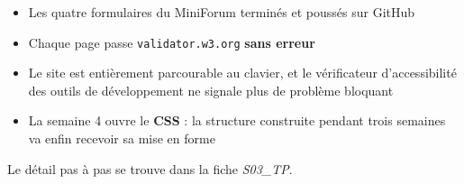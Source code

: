 \documentclass[a4paper,11pt]{article}
\begin{document}
\vspace{8pt}
\begin{tcolorbox}[attention, title={Pour la semaine 4}]
\begin{itemize}
  \item Les quatre formulaires du MiniForum terminés et poussés sur GitHub
  \item Chaque page passe \texttt{validator.w3.org} \textbf{sans erreur}
  \item Le site est entièrement parcourable au clavier, et le vérificateur d'accessibilité des outils de développement ne signale plus de problème bloquant
  \item La semaine 4 ouvre le \textbf{CSS} : la structure construite pendant trois semaines va enfin recevoir sa mise en forme
\end{itemize}
Le détail pas à pas se trouve dans la fiche \textit{S03\_TP}.
\end{tcolorbox}
\end{document}
